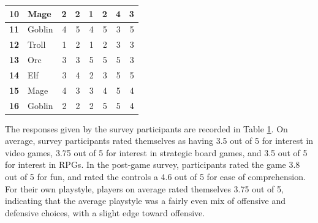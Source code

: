 \begin{table}[htbp]
\begin{tabular}{|rlrrrrrr|}
    \midrule
    \textbf{10} & Mage  & 2     & 2     & 1     & 2     & 4     & 3 \\
    \midrule
    \rowcolor[rgb]{ .851,  .851,  .851} \textbf{11} & Goblin & 4     & 5     & 4     & 5     & 3     & 5 \\
    \midrule
    \textbf{12} & Troll & 1     & 2     & 1     & 2     & 3     & 3 \\
    \midrule
    \rowcolor[rgb]{ .851,  .851,  .851} \textbf{13} & Orc   & 3     & 3     & 5     & 5     & 5     & 3 \\
    \midrule
    \textbf{14} & Elf   & 3     & 4     & 2     & 3     & 5     & 5 \\
    \midrule
    \rowcolor[rgb]{ .851,  .851,  .851} \textbf{15} & Mage  & 4     & 3     & 3     & 4     & 5     & 4 \\
    \midrule
    \textbf{16} & Goblin & 2     & 2     & 2     & 5     & 5     & 4 \\
    \bottomrule
    \end{tabular}%
  \label{tab:survey}%
\end{table}%

The responses given by the survey participants are recorded in Table \ref{tab:survey}. On average, survey participants rated themselves as having 3.5 out of 5 for interest in video games, 3.75 out of 5 for interest in strategic board games, and 3.5 out of 5 for interest in RPGs. In the post-game survey, participants rated the game 3.8 out of 5 for fun, and rated the controls a 4.6 out of 5 for ease of comprehension. For their own playstyle, players on average rated themselves 3.75 out of 5, indicating that the average playstyle was a fairly even mix of offensive and defensive choices, with a slight edge toward offensive.\\

